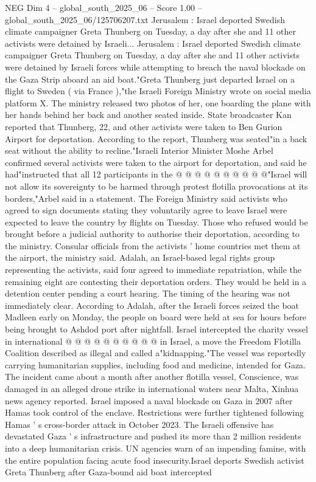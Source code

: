 \begin{textsample}{NEG Dim 4 – global\_south\_2025\_06 – Score 1.00 – global\_south\_2025\_06/125706207.txt}  \label{ex:f4_neg_107}
Jerusalem : Israel deported Swedish climate campaigner Greta Thunberg on Tuesday, a day after she and 11 other activists were detained by Israeli...
Jerusalem : Israel deported Swedish climate campaigner Greta Thunberg on Tuesday, a day after she and 11 other activists were detained by Israeli forces while attempting to breach the naval blockade on the Gaza Strip aboard an aid boat."Greta Thunberg just departed Israel on a flight to Sweden ( via France ),"the Israeli Foreign Ministry wrote on social media platform X.
The ministry released two photos of her, one boarding the plane with her hands behind her back and another seated inside.
State broadcaster Kan reported that Thunberg, 22, and other activists were taken to Ben Gurion Airport for deportation.
According to the report, Thunberg was seated"in a back seat without the ability to recline."Israeli Interior Minister Moshe Arbel confirmed several activists were taken to the airport for deportation, and said he had"instructed that all 12 participants in the @ @ @ @ @ @ @ @ @ @"Israel will not allow its sovereignty to be harmed through protest flotilla provocations at its borders,"Arbel said in a statement.
The Foreign Ministry said activists who agreed to sign documents stating they voluntarily agree to leave Israel were expected to leave the country by flights on Tuesday.
Those who refused would be brought before a judicial authority to authorise their deportation, according to the ministry.
Consular officials from the activists ' home countries met them at the airport, the ministry said.
Adalah, an Israel-based legal rights group representing the activists, said four agreed to immediate repatriation, while the remaining eight are contesting their deportation orders.
They would be held in a detention center pending a court hearing.
The timing of the hearing was not immediately clear.
According to Adalah, after the Israeli forces seized the boat Madleen early on Monday, the people on board were held at sea for hours before being brought to Ashdod port after nightfall.
Israel intercepted the charity vessel in international @ @ @ @ @ @ @ @ @ @ in Israel, a move the Freedom Flotilla Coalition described as illegal and called a"kidnapping."The vessel was reportedly carrying humanitarian supplies, including food and medicine, intended for Gaza.
The incident came about a month after another flotilla vessel, Conscience, was damaged in an alleged drone strike in international waters near Malta, Xinhua news agency reported.
Israel imposed a naval blockade on Gaza in 2007 after Hamas took control of the enclave.
Restrictions were further tightened following Hamas ' s cross-border attack in October 2023.
The Israeli offensive has devastated Gaza ' s infrastructure and pushed its more than 2 million residents into a deep humanitarian crisis.
UN agencies warn of an impending famine, with the entire population facing acute food insecurity.Israel deports Swedish activist Greta Thunberg after Gaza-bound aid boat intercepted

\end{textsample}
